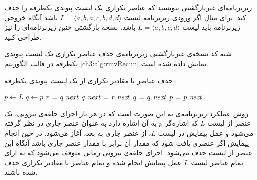  زیربرنامه‌ای غیربازگشتی بنویسید که عناصر تکراری یک لیست پیوندی یکطرفه را حذف کند. برای مثال اگر ورودی زیربرنامه لیست {$L=\langle a,b,a,c,b,d,d\rangle$} باشد آنگاه خروجی زیربرنامه باید لیست {$L=\langle a,b,c,d\rangle$} باشد. نسخه بازگشتی چنین زیربرنامه‌ای  را نیز طراحی کنید.


شبه کد نسخه‌ی غیربازگشتی زیربرنامه‌ی حذف عناصر تکراری یک لیست پیوندی یکطرفه در قالب الگوریتم {\eqref{ch3:alg:rmvRedun}} نمایش داده شده است.
\begin{algorithm}
\caption{حذف عناصر با مقادیر تکراری از یک لیست پیوندی یکطرفه}\label{ch3:alg:rmvRedun}
\begin{latin}
\begin{algorithmic}[1]
				\State	\Return
		\EndIf
		\State	$p \gets L$
				\State	$q \gets p$
								\State	$r \mathrel{\hspace{1pt}=\hspace{1pt}} q.\hspace*{1pt}\mathit{next}$
								\State	$q.\hspace*{1pt}\mathit{next} \mathrel{\hspace{1pt}=\hspace{1pt}} r.\hspace*{1pt}\mathit{next}$
								\State	{}
						\Else
								\State	$q \mathrel{\hspace{1pt}=\hspace{1pt}} q.\hspace*{1pt}\mathit{next}$
						\EndIf
				\EndWhile
				\State	$p \mathrel{\hspace{1pt}=\hspace{1pt}} p.\hspace*{1pt}\mathit{next}$
		\EndWhile		
\EndProcedure
\end{algorithmic}
\end{latin}
\end{algorithm}

روش عملکرد زیربرنامه‌ی {} به این صورت است که در هر بار اجرای حلقه‌ی {} بیرونی، یک عنصر از لیست {$L$} که اشاره‌گر {$p$} به آن اشاره دارد به عنوان عنصر جاری در نظر گرفته می‌شود و عمل پیمایش در لیست {$L$}، از عنصر جاری به بعد، آغاز می‌شود. در حین انجام پیمایش اگر عنصری یافت شود که مقدار آن برابر با مقدار عنصر جاری باشد آنگاه این عنصر از لیست حذف می‌شود. اجرای حلقه‌ی {} بیرونی زمانی متوقف می‌شود که به ازای تمام عناصر لیست {$L$} عمل پیمایش انجام شده و تمام عناصر با مقادیر تکراری حذف شده باشند.

